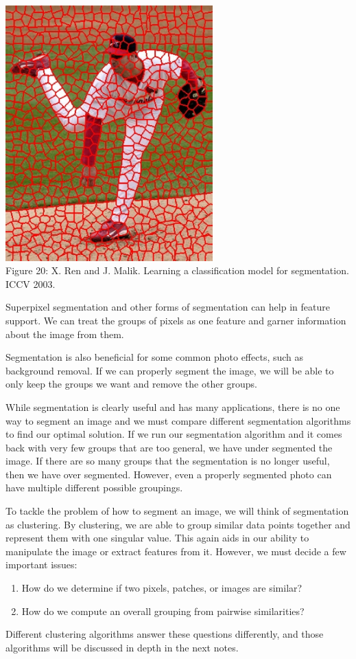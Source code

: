 \documentclass{article}
\begin{document}
\begin{center}
\includegraphics[width=8cm]{superpixels.png} \\
Figure 20: X. Ren and J. Malik. Learning a classification model for segmentation. ICCV 2003.
\end{center}

Superpixel segmentation and other forms of segmentation can help in feature support. We can treat the groups of pixels as one feature and garner information about the image from them. 

Segmentation is also beneficial for some common photo effects, such as background removal. If we can properly segment the image, we will be able to only keep the groups we want and remove the other groups.

While segmentation is clearly useful and has many applications, there is no one way to segment an image and we must compare different segmentation algorithms to find our optimal solution. If we run our segmentation algorithm and it comes back with very few groups that are too general, we have under segmented the image. If there are so many groups that the segmentation is no longer useful, then we have over segmented. However, even a properly segmented photo can have multiple different possible groupings.

To tackle the problem of how to segment an image, we will think of segmentation as clustering. By clustering, we are able to group similar data points together and represent them with one singular value. This again aids in our ability to manipulate the image or extract features from it. However, we must decide a few important issues:
\begin{enumerate}
\item How do we determine if two pixels, patches, or images are similar?
\item How do we compute an overall grouping from	
pairwise similarities?
\end{enumerate}
Different clustering algorithms answer these questions differently, and those algorithms will be discussed in depth in the next notes.
\end{document}
